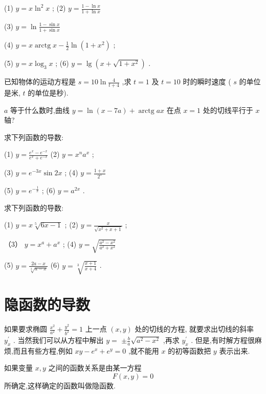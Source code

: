 \documentclass[lang=cn,newtx,12pt,scheme=chinese]{elegantbook}
\begin{document}
\begin{problemset}[习 题 六]
(1) \(y = x{\ln }^{2}x\) ; (2) \(y = \frac{1 - \ln x}{1 + \ln x}\)

(3) \(y = \ln \frac{1 - \sin x}{1 + \sin x}\)

(4) \(y = x\operatorname{arctg}x - \frac{1}{2}\ln \left( {1 + {x}^{2}}\right)\) ;

(5) \(y = x{\log }_{3}x\) ; (6) \(y = \lg \left( {x + \sqrt{1 + {x}^{2}}}\right)\) .

\item 已知物体的运动方程是 \(s = {10}\ln \frac{4}{t + 4}\) ,求 \(t = 1\) 及 \(t = {10}\) 时的瞬时速度 ( \(s\) 的单位是米, \(t\) 的单位是秒).

\item \(a\) 等于什么数时,曲线 \(y = \ln \left( {x - {7a}}\right) + \operatorname{arctg}{ax}\) 在点 \(x = 1\) 处的切线平行于 \(x\) 轴?

\item 求下列函数的导数:

(1) \(y = \frac{{e}^{x} - {e}^{-x}}{{e}^{x} + {e}^{-x}}\) (2) \(y = {x}^{n}{a}^{x}\) ;

(3) \(y = {e}^{-{3x}}\sin {2x}\) ; (4) \(y = \frac{1 + x}{{2}^{x}}\)

(5) \(y = {e}^{-\frac{1}{x}}\) ; (6) \(y = {a}^{2x}\) .

\item 求下列函数的导数:

(1) \(y = x\sqrt[5]{{6x} - 1}\) ; (2) \(y = \frac{x}{\sqrt{{x}^{2} + x + 1}}\) ;

（3） \(y = {x}^{a} + {a}^{x}\) ; (4) \(y = \sqrt{\frac{{a}^{2} - {x}^{2}}{{a}^{2} + {x}^{2}}}\)

(5) \(y = \frac{{2a} - x}{\sqrt[3]{a - x}}\) (6) \(y = \sqrt[3]{\frac{x + 1}{x + 4}}\) .

\end{problemset}

\section{隐函数的导数}

如果要求椭圆 \(\frac{{x}^{2}}{{a}^{2}} + \frac{{y}^{2}}{{b}^{2}} = 1\) 上一点 \(\left( {x,y}\right)\) 处的切线的方程, 就要求出切线的斜率 \({y}_{x}^{\prime }\) . 当然我们可以从方程中解出 \(y =\) \(\pm \frac{b}{a}\sqrt{{a}^{2} - {x}^{2}}\) ,再求 \({y}_{x}^{\prime }\) . 但是,有时解方程很麻烦,而且有些方程,例如 \({xy} - {e}^{x} + {e}^{y} = 0\) ,就不能用 \(x\) 的初等函数把 \(y\) 表示出来.

\begin{definition}[隐函数]

如果变量 \(x,y\) 之间的函数关系是由某一方程
\[
	F\left( {x,y}\right) = 0
\]
所确定,这样确定的函数叫做隐函数.

\end{definition}
\end{document}
